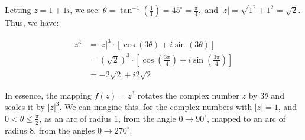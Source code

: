 \documentclass[a4paper, 10pt]{article}
\begin{document}
Letting $z = 1 + 1i$, we see:
$\theta = \tan^{-1}\left(\frac{1}{1}\right) = 45^\circ = \frac{\pi}{4},$
and $|z| = \sqrt{1^2 + 1^2} = \sqrt{2}$.  Thus, we have: \\
\begin{minipage}{0.47\textwidth}
  \begin{align*}
    z^3 & = |z|^3\cdot \left[\cos(3\theta) + i\sin(3\theta)\right]                                            \\
        & = (\sqrt{2})^3\cdot \left[\cos\left(\frac{3\pi}{4}\right) + i\sin\left(\frac{3\pi}{4}\right)\right] \\
        & = -2\sqrt{2} + i 2\sqrt{2}
  \end{align*}
\end{minipage}\hfill
\begin{minipage}{0.47\textwidth}
\end{minipage}\hfill
In essence, the mapping $f(z) = z^3$ rotates the complex number $z$ by $3\theta$ and scales it by $|z|^3$.
We can imagine this, for the complex numbers with $|z| = 1$, and $0 < \theta \leq \frac{\pi}{2}$, as an arc of radius $1$, from the angle $0 \to 90^\circ$, mapped to an arc of radius $8$, from the angles $0 \to 270^\circ$.
\end{document}
